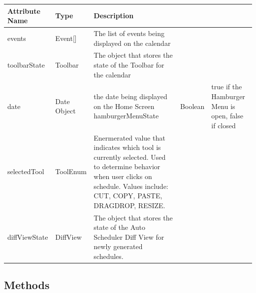 \documentclass{scrreprt}
\begin{document}
\begin{center}
\begin{longtable}{ | p{5cm} | p{5cm} | p{5cm} | }
\hline
\textbf{Attribute Name} & \textbf{Type} & \textbf{Description} \\
\hline
events & Event[] & The list of events being displayed on the calendar \\
\hline
toolbarState & Toolbar & The object that stores the state of the Toolbar for the calendar \\
\hline
date & Date Object & the date being displayed on the Home Screen
\hline
hamburgerMenuState & Boolean & true if the Hamburger Menu is open, false if closed \\
\hline
selectedTool & ToolEnum & Enermerated value that indicates which tool is currently selected. Used to determine behavior when user clicks on schedule. Values include: CUT, COPY, PASTE, DRAGDROP, 
RESIZE.\\
\hline
diffViewState & DiffView & The object that stores the state of the Auto Scheduler Diff View for newly generated schedules.\\
\hline
\end{longtable}
\end{center}

\subsection{Methods}
\end{document}
